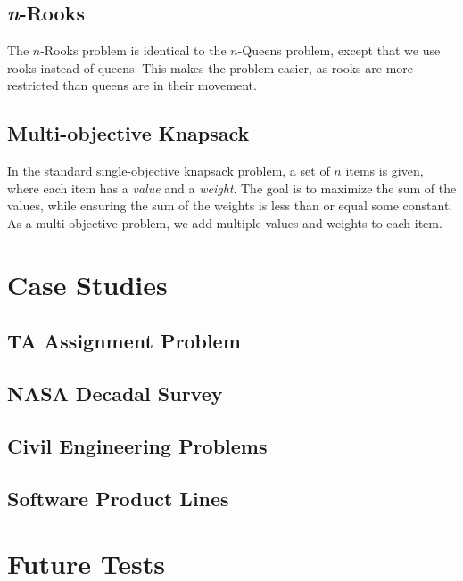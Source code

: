 \documentclass[11pt]{article}
\begin{document}
\subsection{\textit{n}-Rooks}

The $n$-Rooks problem is identical to the $n$-Queens problem, except
that we use rooks instead of queens. This makes the problem easier, as
rooks are more restricted than queens are in their movement.

\subsection{Multi-objective Knapsack}

In the standard single-objective knapsack problem, a set of $n$ items
is given, where each item has a \textit{value} and a \textit{weight}.
The goal is to maximize the sum of the values, while ensuring the sum
of the weights is less than or equal some constant. As a
multi-objective problem, we add multiple values and weights to each
item.

\section{Case Studies}

\subsection{TA Assignment Problem}

\subsection{NASA Decadal Survey}

\subsection{Civil Engineering Problems}

\subsection{Software Product Lines}

\section{Future Tests}

\printbibliography[heading=bibintoc]
\end{document}
